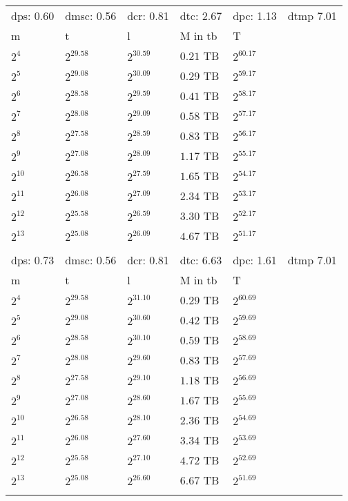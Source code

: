 \begin{tabular}{llllll}
dps: 0.60 & dmsc: 0.56 & dcr: 0.81 & dtc: 2.67 & dpc: 1.13 & dtmp 7.01 \\
m & t & l & M in tb & T \\
$2^{4}$ & $2^{29.58}$ & $2^{30.59}$ & $0.21$ TB & $2^{60.17}$ \\
$2^{5}$ & $2^{29.08}$ & $2^{30.09}$ & $0.29$ TB & $2^{59.17}$ \\
$2^{6}$ & $2^{28.58}$ & $2^{29.59}$ & $0.41$ TB & $2^{58.17}$ \\
$2^{7}$ & $2^{28.08}$ & $2^{29.09}$ & $0.58$ TB & $2^{57.17}$ \\
$2^{8}$ & $2^{27.58}$ & $2^{28.59}$ & $0.83$ TB & $2^{56.17}$ \\
$2^{9}$ & $2^{27.08}$ & $2^{28.09}$ & $1.17$ TB & $2^{55.17}$ \\
$2^{10}$ & $2^{26.58}$ & $2^{27.59}$ & $1.65$ TB & $2^{54.17}$ \\
$2^{11}$ & $2^{26.08}$ & $2^{27.09}$ & $2.34$ TB & $2^{53.17}$ \\
$2^{12}$ & $2^{25.58}$ & $2^{26.59}$ & $3.30$ TB & $2^{52.17}$ \\
$2^{13}$ & $2^{25.08}$ & $2^{26.09}$ & $4.67$ TB & $2^{51.17}$ \\
 &  &  &  &  &  \\
dps: 0.73 & dmsc: 0.56 & dcr: 0.81 & dtc: 6.63 & dpc: 1.61 & dtmp 7.01 \\
m & t & l & M in tb & T \\
$2^{4}$ & $2^{29.58}$ & $2^{31.10}$ & $0.29$ TB & $2^{60.69}$ \\
$2^{5}$ & $2^{29.08}$ & $2^{30.60}$ & $0.42$ TB & $2^{59.69}$ \\
$2^{6}$ & $2^{28.58}$ & $2^{30.10}$ & $0.59$ TB & $2^{58.69}$ \\
$2^{7}$ & $2^{28.08}$ & $2^{29.60}$ & $0.83$ TB & $2^{57.69}$ \\
$2^{8}$ & $2^{27.58}$ & $2^{29.10}$ & $1.18$ TB & $2^{56.69}$ \\
$2^{9}$ & $2^{27.08}$ & $2^{28.60}$ & $1.67$ TB & $2^{55.69}$ \\
$2^{10}$ & $2^{26.58}$ & $2^{28.10}$ & $2.36$ TB & $2^{54.69}$ \\
$2^{11}$ & $2^{26.08}$ & $2^{27.60}$ & $3.34$ TB & $2^{53.69}$ \\
$2^{12}$ & $2^{25.58}$ & $2^{27.10}$ & $4.72$ TB & $2^{52.69}$ \\
$2^{13}$ & $2^{25.08}$ & $2^{26.60}$ & $6.67$ TB & $2^{51.69}$ \\
 &  &  &  &  &  \\

\end{tabular}
